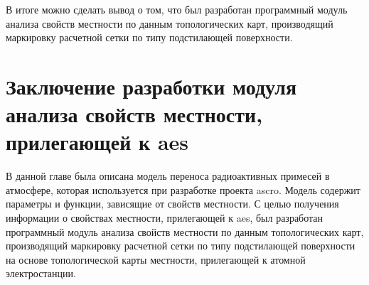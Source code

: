 В итоге можно сделать вывод о том, что был разработан программный модуль анализа свойств местности по данным 
топологических карт, производящий маркировку расчетной сетки по типу подстилающей поверхности.

\section{Заключение разработки модуля анализа свойств местности, прилегающей к \ac{aes}}

В данной главе была описана модель переноса радиоактивных примесей в атмосфере, которая используется при разработке 
проекта \ac{ascro}. Модель содержит параметры и функции, зависящие от свойств местности. С целью получения информации о 
свойствах местности, прилегающей к \ac{aes}, был разработан программный модуль анализа свойств местности по данным 
топологических карт, производящий маркировку расчетной сетки по типу подстилающей поверхности на основе топологической 
карты местности, прилегающей к атомной электростанции.